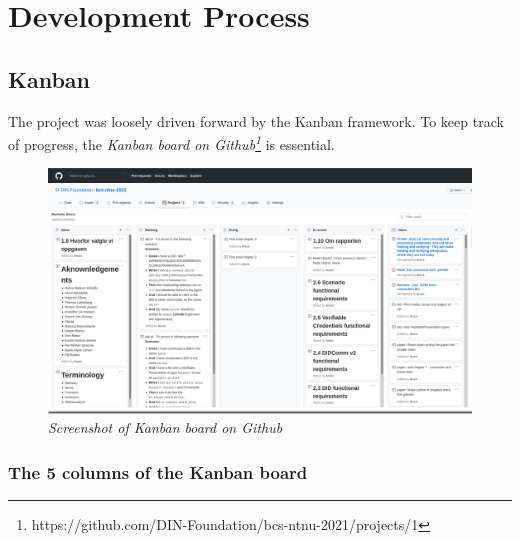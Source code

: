 \chapter{Development Process}




\section{Kanban}

The project was loosely driven forward by the Kanban framework. To keep track of progress, the \textit{Kanban board on Github\footnote{https://github.com/DIN-Foundation/bcs-ntnu-2021/projects/1}} is essential.

\begin{figure}[htbp]
  \centering
  \includegraphics[width=1\textwidth]{figures/github-kanban}
  \caption{\textit{Screenshot of Kanban board on Github}}
\end{figure}

\subsection{The 5 columns of the Kanban board}

